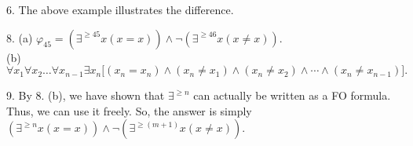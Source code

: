 \documentclass{article}
\begin{document}
\hrulefill

6. The above example illustrates the difference.

\hrulefill

8. (a) $\varphi_{45} = (\exists^{\ge45}x (x = x)) \wedge \neg(\exists^{\ge46}x(x \neq x)).$\\

(b) $\forall x_1 \forall x_2 \ldots \forall x_{n-1} \exists x_n \big[(x_n = x_n) \wedge (x_n \neq x_1) \wedge (x_n \neq x_{2}) \wedge \cdots \wedge (x_n \neq x_{n-1})\big].$\\


\hrulefill

9. By 8. (b), we have shown that $\exists^{\ge n}$ can actually be written as a FO formula. Thus, we can use it freely. So, the answer is simply $(\exists^{\ge n}x (x = x)) \wedge \neg(\exists^{\ge (m+1)}x(x \neq x)).$
\end{document}
